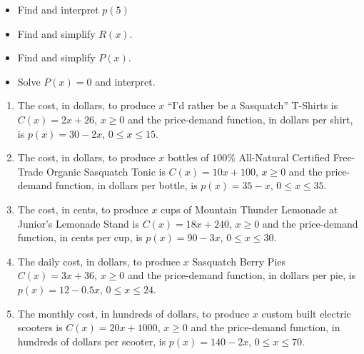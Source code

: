 {\begin{multicols}{2}
\begin{itemize}
\end{itemize}
\end{multicols}

\begin{multicols}{2}
\begin{itemize}

\item  Find and interpret $p(5)$
\item  Find and simplify $R(x)$.

\end{itemize}
\end{multicols}

\begin{multicols}{2}
\begin{itemize}

\item  Find and simplify $P(x)$.
\item  Solve $P(x) = 0$ and interpret.

\end{itemize}
\end{multicols}

\begin{enumerate}
\setcounter{enumi}{\value{HW}}

\item  The cost, in dollars, to produce $x$ ``I'd rather be a Sasquatch'' T-Shirts is $C(x) = 2x+26$, $x \geq 0$ and the price-demand function, in dollars per shirt,  is $p(x) = 30 - 2x$, $0 \leq x \leq 15$. \label{econexerfirst}

\item  The cost, in dollars, to produce $x$ bottles of $100 \%$ All-Natural Certified Free-Trade Organic Sasquatch Tonic is $C(x) = 10x+100$, $x \geq 0$ and the price-demand function, in dollars per bottle,  is $p(x) = 35 - x$, $0 \leq x \leq 35$.


\item  The cost, in cents, to produce $x$ cups of Mountain Thunder Lemonade at Junior's Lemonade Stand  is $C(x) = 18x + 240$, $x \geq 0$ and the price-demand function, in cents per cup,  is $p(x) = 90-3x$, $0 \leq x \leq 30$.


\item  The daily cost, in dollars, to produce $x$ Sasquatch Berry Pies $C(x) = 3x + 36$, $x \geq 0$ and the price-demand function, in  dollars per pie,  is $p(x) = 12-0.5x$, $0 \leq x \leq 24$.

\item  The monthly cost, in hundreds of dollars, to produce $x$ custom built electric scooters is $C(x) = 20x + 1000$, $x \geq 0$ and the price-demand function, in  hundreds of dollars per scooter,  is $p(x) = 140-2x$, $0 \leq x \leq 70$. \label{econexerlast}

\setcounter{HW}{\value{enumi}}
\end{enumerate}
} %

